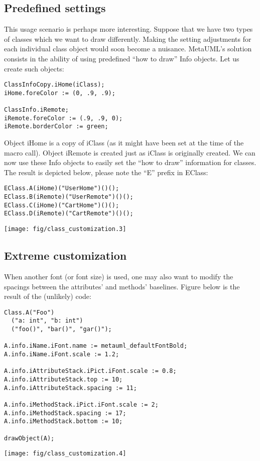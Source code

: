 \documentclass{article}
\newcommand{\code}{\ttfamily}
\begin{document}
\subsection{Predefined settings}

This usage scenario is perhaps more interesting. Suppose that we have two
types of classes which we want to draw differently. Making the setting adjustments
for each individual class object would soon become a nuisance. MetaUML's solution consists in the
ability of using predefined ``how to draw'' {\code Info} objects. Let us create such objects:

\begin{verbatim}
ClassInfoCopy.iHome(iClass);
iHome.foreColor := (0, .9, .9);

ClassInfo.iRemote;
iRemote.foreColor := (.9, .9, 0);
iRemote.borderColor := green;
\end{verbatim}

Object {\code iHome} is a copy of {\code iClass} (as it might have been set at
the time of the macro call). Object {\code iRemote} is created just as {\code iClass}
is originally created. We can now use these {\code Info} objects to easily set the
``how to draw'' information for classes. The result is depicted below,
please note the ``{\code E}'' prefix in {\code EClass}:

\begin{multicols}{2}
\begin{verbatim}
EClass.A(iHome)("UserHome")()();
EClass.B(iRemote)("UserRemote")()();
EClass.C(iHome)("CartHome")()();
EClass.D(iRemote)("CartRemote")()();
\end{verbatim}
\columnbreak
\hspace{1cm}\texttt{[image: fig/class\_customization.3]}
\end{multicols}

\subsection{Extreme customization}

When another font (or font size) is used, one may also want to modify the spacings between the
attributes' and methods' baselines. Figure below is the result of the
(unlikely) code:

\begin{multicols}{2}
\begin{verbatim}
Class.A("Foo")
  ("a: int", "b: int")
  ("foo()", "bar()", "gar()");

A.info.iName.iFont.name := metauml_defaultFontBold;
A.info.iName.iFont.scale := 1.2;

A.info.iAttributeStack.iPict.iFont.scale := 0.8;
A.info.iAttributeStack.top := 10;
A.info.iAttributeStack.spacing := 11;

A.info.iMethodStack.iPict.iFont.scale := 2;
A.info.iMethodStack.spacing := 17;
A.info.iMethodStack.bottom := 10;

drawObject(A);
\end{verbatim}
\columnbreak
\hspace{4cm}\texttt{[image: fig/class\_customization.4]}
\end{multicols}
\end{document}
